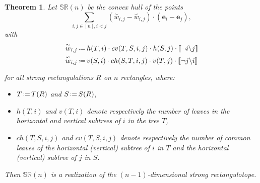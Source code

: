 \documentclass{amsart}
\newtheorem{theorem}{Theorem}%
\theoremstyle{definition}
\newcommand{\eqdef}{\mbox{\,\raisebox{0.2ex}{\scriptsize\ensuremath{\mathrm:}}\ensuremath{=}\,}} %
\newcommand{\polytope}[1]{\mathds{#1}} %
\newcommand{\SRP}{\polytope{SR}} %
\newcommand{\yang}[1]{\overset{\backsim}{#1}}
\newcommand{\yin}[1]{\overset{\sim}{#1}}
\begin{document}
\begin{theorem}
  Let $\SRP (n)$ be the convex hull of the points
  \[
  \sum_{i,j\in [n], i< j} (\yin{w}_{i,j} - \yang{w}_{i,j})\cdot (\mathbf{e}_i - \mathbf{e}_j),
  \]
  with
  \[
  \begin{split}
    \yin{w}_{i,j} \eqdef & h(T, i) \cdot cv (T, S, i, j)\cdot h(S, j)\cdot \llbracket \neg i\backslash j \rrbracket \\%
    \yang{w}_{i,j} \eqdef & v(S, i) \cdot ch (S, T, i, j)\cdot v(T, j) \cdot \llbracket \neg j\backslash i \rrbracket
  \end{split}
  \]
  


  for all strong rectangulations $R$ on $n$ rectangles, where:
  \begin{itemize}
  \item $T \eqdef T(R)$ and $S \eqdef S(R)$,
  \item $h(T,i)$ and $v(T,i)$ denote respectively the number of leaves in the horizontal and vertical subtrees of $i$ in the tree $T$,
  \item $ch (T,S,i,j)$ and $cv (T,S,i,j)$ denote respectively the number of common leaves of the horizontal (vertical) subtree of $i$ in $T$ and the horizontal (vertical) subtree of $j$ in $S$.
  \end{itemize}
Then $\SRP (n)$ is a realization of the $(n-1)$-dimensional strong rectangulotope.  
\end{theorem}

\end{document}
